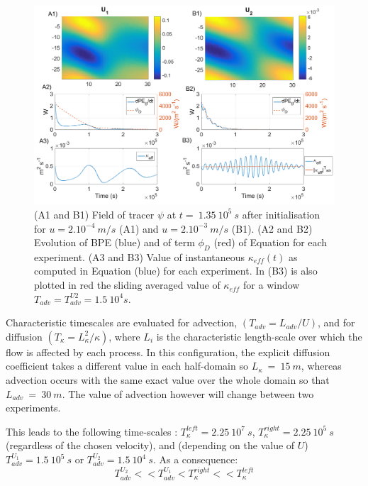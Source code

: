 \begin{figure}[h!]
\centering
\includegraphics[width=1\textwidth]{./CHAP_BPE/Fig_numlab_advdiff3.png}
\caption[Tracer field and evaluation of $\kappa_{eff}$ for configuration $BPE_{ts}$]{(A1 and B1) Field of tracer $\psi$ at $t= \ 1.35\ 10^5\ s$ after initialisation for $u=2.10^{-4} \ m/s$ (A1) and $u=2.10^{-3} \ m/s$ (B1). (A2 and B2) Evolution of BPE (blue) and of term $\phi_D$ (red) of Equation  for each experiment. (A3 and B3) Value of instantaneous $\kappa_{eff} (t)$ as computed in Equation  (blue) for each experiment. In (B3) is also plotted in red the sliding averaged value of $\kappa_{eff}$ for a window $T_{adv}=T_{adv}^{U2}=1.5\ 10^4 s$.}
\label{fig4numlab}
\end{figure}

Characteristic timescales are evaluated for advection, $(T_{adv}=L_{adv}/U)$, and for diffusion $(T_{\kappa}=L_{\kappa}^2/{\kappa})$, where $L_i$ is the characteristic length-scale over which the flow is affected by each process. In this configuration, the explicit diffusion coefficient takes a different value in each half-domain so $L_{\kappa}\ =\ 15\ m$, whereas advection occurs with the same exact value over the whole domain so that $L_{adv}\ =\ 30\ m$. The value of advection however will change between two experiments.

This leads to the following time-scales : $T_{\kappa}^{left}=2.25 \ 10^7 \ s$, $T_{\kappa}^{right}=2.25 \ 10^5 \ s$ (regardless of the chosen velocity), and (depending on the value of $U$) $T_{adv}^{U_1}=1.5 \ 10^5 \ s$ or $T_{adv}^{U_2}=1.5 \ 10^4 \ s$. As a consequence:
\begin{equation}
\displaystyle
T_{adv}^{U_2}<<T_{adv}^{U_1}<T_{\kappa}^{right}<<T_{\kappa}^{left}
\end{equation}

